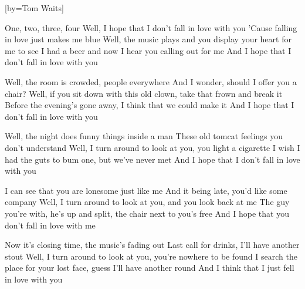 [by={Tom Waits}]


  \chordsoff

  \beginverse
  One, two, three, four
  Well, I hope that I don't fall in love with you
  'Cause falling in love just makes me blue
  Well, the music plays and you display your heart for me to see
  I had a beer and now I hear you calling out for me
  And I hope that I don't fall in love with you
  \endverse

  \beginverse
  Well, the room is crowded, people everywhere
  And I wonder, should I offer you a chair?
  Well, if you sit down with this old clown, take that frown and break it
  Before the evening's gone away, I think that we could make it
  And I hope that I don't fall in love with you
  \endverse

  \beginverse
  Well, the night does funny things inside a man
  These old tomcat feelings you don't understand
  Well, I turn around to look at you, you light a cigarette
  I wish I had the guts to bum one, but we've never met
  And I hope that I don't fall in love with you
  \endverse

  \beginverse
  I can see that you are lonesome just like me
  And it being late, you'd like some company
  Well, I turn around to look at you, and you look back at me
  The guy you're with, he's up and split, the chair next to you's free
  And I hope that you don't fall in love with me
  \endverse

  \beginverse
  Now it's closing time, the music's fading out
  Last call for drinks, I'll have another stout
  Well, I turn around to look at you, you're nowhere to be found
  I search the place for your lost face, guess I'll have another round
  And I think that I just fell in love with you
  \endverse

\endsong
